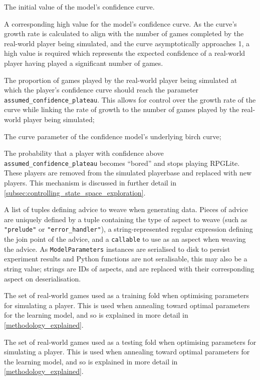 \begin{description}[style=multiline,leftmargin=4cm]
  \item[starting confidence] The initial value of the model's confidence curve.
  \item[assumed confidence plateau] A corresponding high value for the model's
  confidence curve. As the curve's growth rate is calculated to align with the
  number of games completed by the real-world player being simulated, and the
  curve asymptotically approaches 1, a high value is required which represents
  the expected confidence of a real-world player having played a significant
  number of games.
  \item[curve inflection relative to numgames] The proportion of games played by
  the real-world player being simulated at which the player's confidence
  curve should reach the parameter \\\lstinline{assumed_confidence_plateau}. This
  allows for control over the growth rate of the curve while linking the rate of
  growth to the number of games played by the real-world player being simulated;
  \item[C] The curve parameter of the confidence model's underlying birch curve;
  \item[prob bored] The probability that a player with confidence above
  \lstinline{assumed_confidence_plateau} becomes ``bored'' and stops playing
  RPGLite. These players are removed from the simulated playerbase and replaced
  with new players. This mechanism is discussed in further detail in
  \cref{subsec:controlling_state_space_exploration}.
  \item[advice] A list of tuples defining advice to weave when generating data.
  Pieces of advice are uniquely defined by a tuple containing the type of aspect
  to weave (such as \lstinline{"prelude"} or \lstinline{"error_handler"}), a
  string-represented regular expression defining the join point of the advice,
  and a \lstinline{callable} to use as an aspect when weaving the advice. As
  \lstinline{ModelParameters} instances are serialised to disk to persist
  experiment results and Python functions are not seralisable, this may also be
  a string value; strings are IDs of aspects, and are replaced with their
  corresponding aspect on deserialisation.
  \item[training data] The set of real-world games used as a training fold when
  optimising parameters for simulating a player. This is used when annealing
  toward optimal parameters for the learning model, and so is explained in more
  detail in \cref{methodology_explained}.
  \item[testing data] The set of real-world games used as a testing fold when
  optimising parameters for simulating a player. This is used when annealing
  toward optimal parameters for the learning model, and so is explained in more
  detail in \cref{methodology_explained}.
\end{description}



